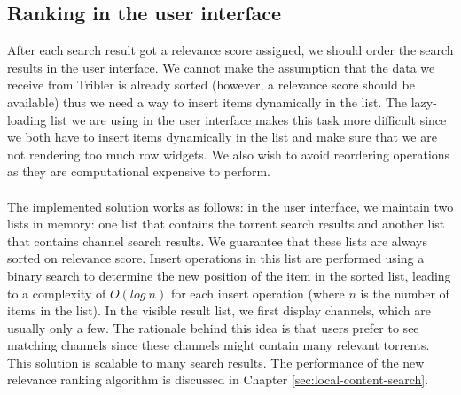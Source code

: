 \subsection{Ranking in the user interface}
After each search result got a relevance score assigned, we should order the search results in the user interface. We cannot make the assumption that the data we receive from Tribler is already sorted (however, a relevance score should be available) thus we need a way to insert items dynamically in the list. The lazy-loading list we are using in the user interface makes this task more difficult since we both have to insert items dynamically in the list and make sure that we are not rendering too much row widgets. We also wish to avoid reordering operations as they are computational expensive to perform.\\\\
The implemented solution works as follows: in the user interface, we maintain two lists in memory: one list that contains the torrent search results and another list that contains channel search results. We guarantee that these lists are always sorted on relevance score. Insert operations in this list are performed using a binary search to determine the new position of the item in the sorted list, leading to a complexity of $ O(log\ n) $ for each insert operation (where $ n $ is the number of items in the list). In the visible result list, we first display channels, which are usually only a few. The rationale behind this idea is that users prefer to see matching channels since these channels might contain many relevant torrents. This solution is scalable to many search results. The performance of the new relevance ranking algorithm is discussed in Chapter \ref{sec:local-content-search}.